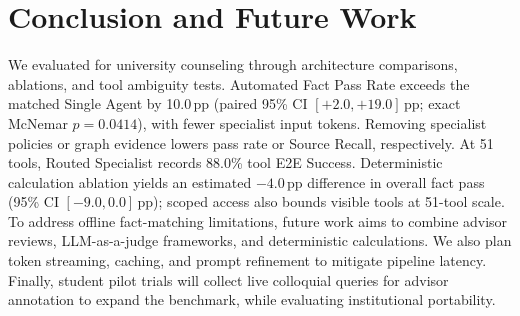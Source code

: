 \section{Conclusion and Future Work}
\label{sec:conclusion}

We evaluated \system{} for university counseling through architecture comparisons, ablations, and tool ambiguity tests. Automated Fact Pass Rate exceeds the matched Single Agent by 10.0\,pp (paired 95\% CI $[+2.0, +19.0]$\,pp; exact McNemar $p{=}0.0414$), with fewer specialist input tokens. Removing specialist policies or graph evidence lowers pass rate or Source Recall, respectively. At 51 tools, Routed Specialist records 88.0\% tool E2E Success. Deterministic calculation ablation yields an estimated $-4.0$\,pp difference in overall fact pass (95\% CI $[-9.0, 0.0]$\,pp); scoped access also bounds visible tools at 51-tool scale. To address offline fact-matching limitations, future work aims to combine advisor reviews, LLM-as-a-judge frameworks, and deterministic calculations. We also plan token streaming, caching, and prompt refinement to mitigate pipeline latency. Finally, student pilot trials will collect live colloquial queries for advisor annotation to expand the benchmark, while evaluating institutional portability.
